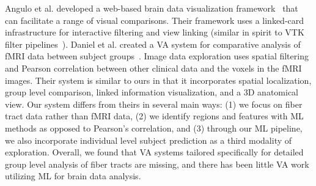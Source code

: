 Angulo et al. developed %
a web-based brain data visualization framework~\cite{angulo2016multi} that can facilitate a range of visual comparisons. Their framework uses a linked-card infrastructure for interactive filtering and view linking (similar in spirit to VTK filter pipelines~\cite{schroeder2002visualization}).
Daniel et al. created a VA system for comparative analysis of fMRI data between subject groups~\cite{bm.20191232}. Image data exploration uses spatial filtering and Pearson correlation between other clinical data and the voxels in the fMRI images. Their system is similar to ours in that it incorporates spatial localization, group level comparison, linked information visualization, and a 3D anatomical view. Our system differs from theirs in several main ways: (1) we focus on fiber tract data rather than fMRI data, (2) we identify regions and features with ML methods as opposed to Pearson's correlation, and (3) through our ML pipeline, we also incorporate individual level subject prediction as a third modality of exploration.  Overall, we found that VA systems tailored specifically for detailed group level analysis of fiber tracts are missing, and there has been little VA work utilizing ML for brain data analysis.




